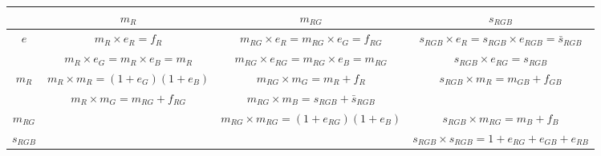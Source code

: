 \documentclass[12pt,a4paper]{standalone}
\begin{document}
\begin{table}[h!]
    \centering
    \begin{tabular}{|c|c|c|c|}
    \hline
       &  $m_{R}$ & $m_{RG}$ & $s_{RGB}$  \\
       \hline
    $e$       & $m_R \times e_R = f_R$ & $m_{RG} \times e_R = m_{RG} \times e_G = f_{RG}$ &$s_{RGB} \times e_R =  s_{RGB} \times e_{RGB} = \bar s_{RGB}$\\
     & $m_R \times e_G = m_R \times e_B =m_R$ &$m_{RG} \times e_{RG} = m_{RG} \times e_B =m_{RG}$& $s_{RGB} \times e_{RG} =s_{RGB}$\\
    \hline
    $m_{R}$  &$m_R \times m_R = (1+e_G)(1+e_B)$& $m_{RG} \times m_{G}= m_R + f_R$& $s_{RGB} \times m_R = m_{GB} + f_{GB}$\\
     & $m_{R} \times m_{G} = m_{RG} + f_{RG}$ &$m_{RG} \times m_B = s_{RGB}+ \bar s_{RGB}$ & \\
    \hline
    $m_{RG}$&&$m_{RG} \times m_{RG} = (1+e_{RG})(1+e_B)$&$ s_{RGB} \times m_{RG} = m_{B} + f_{B}$\\
    \hline
    $s_{RGB}$ & &&$s_{RGB} \times s_{RGB} = 1 + e_{RG}+ e_{GB} + e_{RB}$\\
    \hline
    \end{tabular}
    \label{tab:D4fusion}
\end{table}
\end{document}
